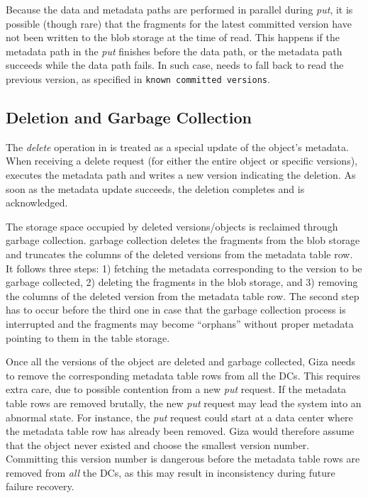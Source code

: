 Because the data and metadata paths are performed in parallel during {\em put},
it is possible (though rare) that the fragments for the latest committed version
have not been written to the blob storage at the time of read.
This happens if the metadata path in the {\em put} finishes before the data path,
or the metadata path succeeds while the data path fails.
In such case, {\name} needs to fall back to read the previous version,
as specified in {\tt known committed versions}.

\subsection{Deletion and Garbage Collection}
\label{sec:garbagecollection}

The \emph{delete} operation in \name is treated as a special update of the
object's metadata. When receiving a delete request
(for either the entire object or specific versions), \name executes the
metadata path and writes a new version indicating the deletion.
As soon as the metadata update succeeds, the deletion completes and is acknowledged.


The storage space occupied by deleted versions/objects is reclaimed through garbage collection.
\name garbage collection deletes the fragments from the blob storage and truncates the columns of the deleted versions
from the metadata table row. It follows three steps: 1) fetching the metadata
corresponding to the version to be garbage collected, 2) deleting the 
fragments in the blob storage, and 3) removing the columns of the deleted version from
the metadata table row. The second step has to occur before the third one in
case that the garbage collection process is interrupted and the fragments
may become ``orphans'' without proper metadata pointing to them in the table
storage.

Once all the versions of the object are deleted and garbage collected,
Giza needs to remove the corresponding metadata table rows from all the DCs.
This requires extra care, due to possible contention from a new \emph{put} request.
If the metadata table rows are removed brutally, the new {\em put} request 
may lead the system into an abnormal state.
For instance, the {\em put} request could start at a data center where the metadata table
row has already been removed. Giza would therefore assume that the object
never existed and choose the smallest version number. Committing
this version number is dangerous before the metadata table rows are removed from
\emph{all} the DCs, as this may result in inconsistency during future failure
recovery.

